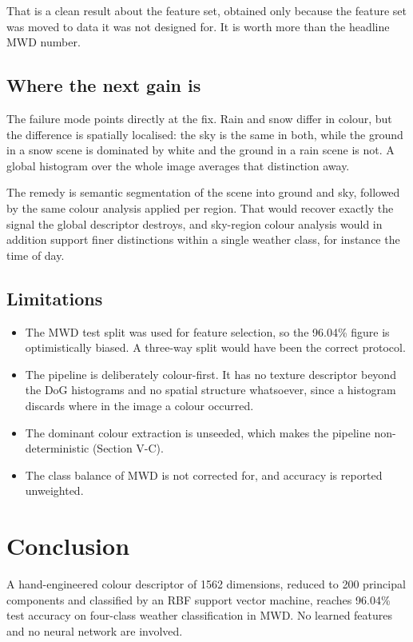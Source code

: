 \documentclass[10pt, conference, letterpaper]{IEEEtran}
\begin{document}
That is a clean result about the feature set, obtained only because the feature set was moved to data it was not designed for. It is worth more than the headline MWD number.

\subsection{Where the next gain is}

The failure mode points directly at the fix. Rain and snow differ in colour, but the difference is spatially localised: the sky is the same in both, while the ground in a snow scene is dominated by white and the ground in a rain scene is not. A global histogram over the whole image averages that distinction away.

The remedy is semantic segmentation of the scene into ground and sky, followed by the same colour analysis applied per region. That would recover exactly the signal the global descriptor destroys, and sky-region colour analysis would in addition support finer distinctions within a single weather class, for instance the time of day.

\subsection{Limitations}

\begin{itemize}
  \item The MWD test split was used for feature selection, so the 96.04\% figure is optimistically biased. A three-way split would have been the correct protocol.
  \item The pipeline is deliberately colour-first. It has no texture descriptor beyond the DoG histograms and no spatial structure whatsoever, since a histogram discards where in the image a colour occurred.
  \item The dominant colour extraction is unseeded, which makes the pipeline non-deterministic (Section V-C).
  \item The class balance of MWD is not corrected for, and accuracy is reported unweighted.
\end{itemize}

\section{Conclusion}

A hand-engineered colour descriptor of 1562 dimensions, reduced to 200 principal components and classified by an RBF support vector machine, reaches 96.04\% test accuracy on four-class weather classification in MWD. No learned features and no neural network are involved.
\end{document}
